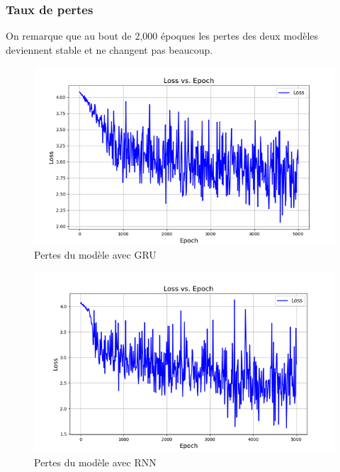\subsubsection{Taux de pertes}
On remarque que au bout de 2,000 époques les pertes des deux modèles deviennent stable et ne changent pas beaucoup.
\begin{figure}[H]
    \centering
    \includegraphics[width=.8\textwidth]{figures/loss_gru.png}
    \caption{Pertes du modèle avec GRU}
    \label{fig:loss_gru}
\end{figure}
\begin{figure}[H]
    \centering
    \includegraphics[width=.8\textwidth]{figures/loss_rnn.png}
    \caption{Pertes du modèle avec RNN}
    \label{fig:loss_rnn}
\end{figure}